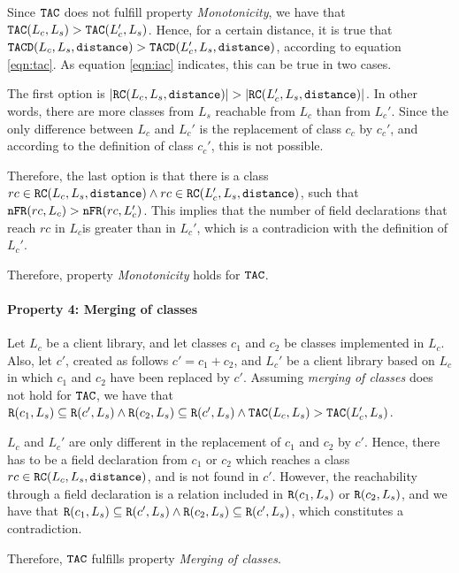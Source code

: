 Since $\verb|TAC|$ does not fulfill property \textit{Monotonicity}, we have that $\verb|TAC|(L_c, L_s) > \verb|TAC|(L_c', L_s)$. Hence, for a certain distance, it is true that $\verb|TACD|(L_c,L_s,\verb|distance|) > \verb|TACD|(L_c',L_s,\verb|distance|)$, according to equation \ref{eqn:tac}. As equation \ref{eqn:iac} indicates, this can be true in two cases.

The first option is $|\verb|RC|(L_c,L_s,\verb|distance|)| > |\verb|RC|(L_c',L_s,\verb|distance|)|$.
In other words, there are more classes from $L_s$ reachable from $L_c$ than from $L_c'$. Since the only difference between $L_c$ and $L_c'$ is the replacement of class $c_c$ by $c_c'$, and according to the definition of class $c_c'$, this is not possible.

Therefore, the last option is that there is a class $rc \in \verb|RC|(L_c,L_s,\verb|distance|) \land rc \in \verb|RC|(L_c',L_s,\verb|distance|)$, such that   $\verb|nFR|(rc,L_c) > \verb|nFR|(rc,L_c')$. This implies that the number of field declarations that reach $rc$ in $L_c$is greater than in $L_c'$, which is a contradicion with the definition of $L_c'$.

Therefore, property \textit{Monotonicity} holds for $\verb|TAC|$.

\paragraph{Property 4: Merging of classes}
Let $L_c$ be a client library, and let classes $c_1$ and $c_2$ be classes implemented in $L_c$. Also, let $c'$, created as follows $c' = c_1 + c_2$, and $L_c'$ be a client library based on $L_c$ in which $c_1$ and $c_2$ have been replaced by $c'$. Assuming \textit{merging of classes} does not hold for $\verb|TAC|$, we have that $\verb|R|(c_1, L_s) \subseteq \verb|R|(c', L_s) \land \verb|R|(c_2, L_s) \subseteq \verb|R|(c', L_s) \land \verb|TAC|(L_c, L_s) > \verb|TAC|(L_c', L_s)$.

$L_c$ and $L_c'$ are only different in the replacement of $c_1$ and $c_2$ by $c'$. Hence, there has to be a field declaration from $c_1$ or $c_2$ which reaches a class $rc \in \verb|RC|(L_c,L_s,\verb|distance|)$, and is not found in $c'$. However, the reachability through a field declaration is a relation included in $\verb|R|(c_1, L_s)$ or $\verb|R|(c_2, L_s)$, and we have that $\verb|R|(c_1, L_s) \subseteq \verb|R|(c', L_s) \land \verb|R|(c_2, L_s) \subseteq \verb|R|(c', L_s)$, which constitutes a contradiction.

Therefore, $\verb|TAC|$ fulfills property \textit{Merging of classes}.

